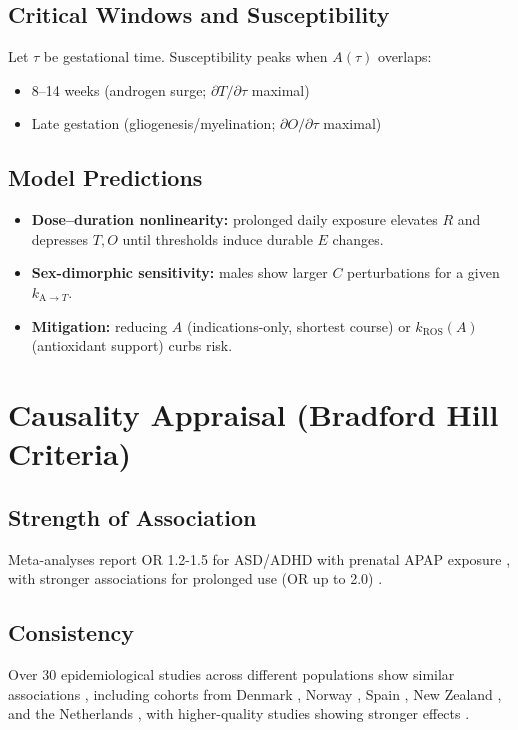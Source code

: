\documentclass[12pt]{article}
\begin{document}
\subsection{Critical Windows and Susceptibility}
Let $\tau$ be gestational time. Susceptibility peaks when $A(\tau)$ overlaps:
\begin{itemize}
  \item 8--14 weeks (androgen surge; $\partial T/\partial \tau$ maximal)
  \item Late gestation (gliogenesis/myelination; $\partial O/\partial \tau$ maximal)
\end{itemize}

\subsection{Model Predictions}
\begin{itemize}
  \item \textbf{Dose--duration nonlinearity:} prolonged daily exposure elevates $R$ and depresses $T,O$ until thresholds induce durable $E$ changes.
  \item \textbf{Sex-dimorphic sensitivity:} males show larger $C$ perturbations for a given $k_{\mathrm{A}\to T}$.
  \item \textbf{Mitigation:} reducing $A$ (indications-only, shortest course) or $k_{\mathrm{ROS}}(A)$ (antioxidant support) curbs risk.
\end{itemize}

\section{Causality Appraisal (Bradford Hill Criteria)}

\subsection{Strength of Association}
Meta-analyses report OR 1.2-1.5 for ASD/ADHD with prenatal APAP exposure \citep{masarwa2018}, with stronger associations for prolonged use (OR up to 2.0) \citep{liew2014,thompson2014}.

\subsection{Consistency}
Over 30 epidemiological studies across different populations show similar associations \citep{navarro2025}, including cohorts from Denmark \citep{liew2016}, Norway \citep{ystrom2017}, Spain \citep{avella2016}, New Zealand \citep{thompson2014}, and the Netherlands \citep{vlenterie2016}, with higher-quality studies showing stronger effects \citep{chen2023}.
\end{document}
